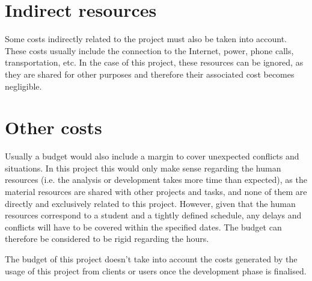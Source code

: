 \section{Indirect resources}
Some costs indirectly related to the project must also be taken into account. These costs usually include the connection to the Internet, power, phone calls, transportation, etc. In the case of this project, these resources can be ignored, as they are shared for other purposes and therefore their associated cost becomes negligible.

\section{Other costs}
Usually a budget would also include a margin to cover unexpected conflicts and situations. In this project this would only make sense regarding the human resources (i.e. the analysis or development takes more time than expected), as the material resources are shared with other projects and tasks, and none of them are directly and exclusively related to this project. However, given that the human resources correspond to a student and a tightly defined schedule, any delays and conflicts will have to be covered within the specified dates. The budget can therefore be considered to be rigid regarding the hours.

The budget of this project doesn’t take into account the costs generated by the usage of this project from clients or users once the development phase is finalised.
